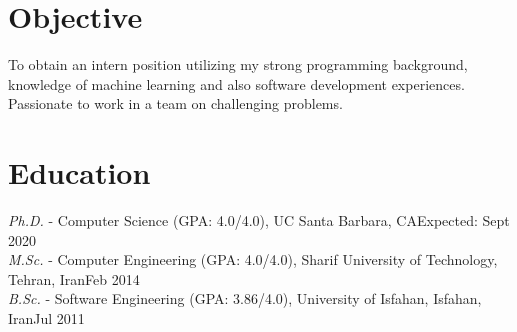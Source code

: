 \documentclass[letter]{res}
\begin{document}
	\newif \iflong
	\longtrue     %
	
	\address{+1 (805) 886 7101 ~~~ 6520 El Colegio Rd, Apt 2308, Santa Barbara, CA 93106 ~~~ \href{mailto:omid55@cs.ucsb.edu}{omid55@cs.ucsb.edu} ~~~ \href{https://github.com/omid55/}{Github} ~~~ \href{https://www.linkedin.com/in/omid-askarisichani-07bb5230}{LinkedIn}}
	\begin{resume}
		\noindent\makebox[\linewidth]{\rule{\paperwidth}{0.4pt}}
		
		
		\section{Objective}
		To obtain an intern position utilizing my strong programming background, knowledge of machine learning and also software development experiences. Passionate to work in a team on challenging problems.
		
		
		\section{Education}
		{\sl Ph.D.} - Computer Science (GPA: 4.0/4.0), UC Santa Barbara, CA\hfill Expected: Sept 2020\vspace{-1mm}\\
		{\sl M.Sc.} - Computer Engineering (GPA: 4.0/4.0), Sharif University of Technology, Tehran, Iran\hfill Feb 2014\vspace{-1mm}\\
		{\sl B.Sc.} - Software Engineering (GPA: 3.86/4.0), University of Isfahan, Isfahan, Iran\hfill Jul 2011\vspace{-1mm}
		
		

\end{resume}
\end{document}

